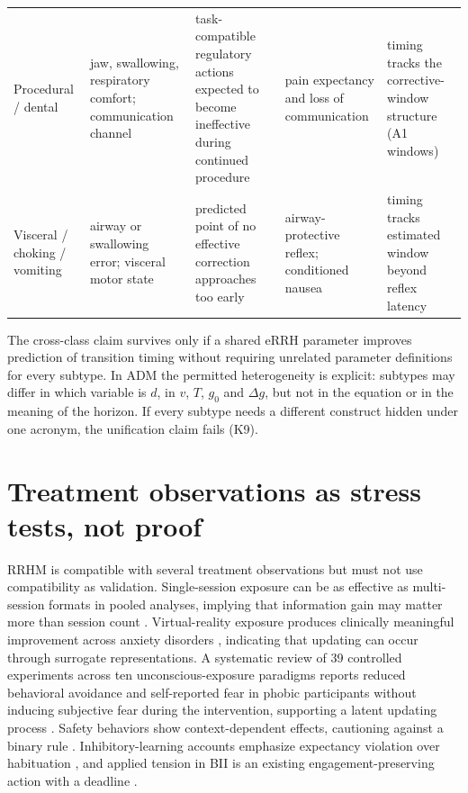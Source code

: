 \documentclass[9pt,twocolumn]{article}
\begin{document}
\begin{table}[!t]
\begin{tabularx}{\textwidth}{p{}p{}X p{}p{}}
Procedural / dental & jaw, swallowing, respiratory comfort; communication channel & task-compatible regulatory actions expected to become ineffective during continued procedure & pain expectancy and loss of communication & timing tracks the corrective-window structure (A1 windows) \\
Visceral / choking / vomiting & airway or swallowing error; visceral motor state & predicted point of no effective correction approaches too early & airway-protective reflex; conditioned nausea & timing tracks estimated window beyond reflex latency \\
\bottomrule
\end{tabularx}
\end{table}

The cross-class claim survives only if a shared eRRH parameter improves prediction of transition timing without requiring unrelated parameter definitions for every subtype. In ADM the permitted heterogeneity is explicit: subtypes may differ in which variable is $d$, in $v$, $T$, $g_0$ and $\Delta g$, but not in the equation or in the meaning of the horizon. If every subtype needs a different construct hidden under one acronym, the unification claim fails (K9).

\section{Treatment observations as stress tests, not proof}\label{sec:txobs}
RRHM is compatible with several treatment observations but must not use compatibility as validation. Single-session exposure can be as effective as multi-session formats in pooled analyses, implying that information gain may matter more than session count \cite{odgers2022}. Virtual-reality exposure produces clinically meaningful improvement across anxiety disorders \cite{carl2019}, indicating that updating can occur through surrogate representations. A systematic review of 39 controlled experiments across ten unconscious-exposure paradigms reports reduced behavioral avoidance and self-reported fear in phobic participants without inducing subjective fear during the intervention, supporting a latent updating process \cite{siegel2025}. Safety behaviors show context-dependent effects, cautioning against a binary rule \cite{meckes2025}. Inhibitory-learning accounts emphasize expectancy violation over habituation \cite{craske2014}, and applied tension in BII is an existing engagement-preserving action with a deadline \cite{ost1987}.
\end{document}
